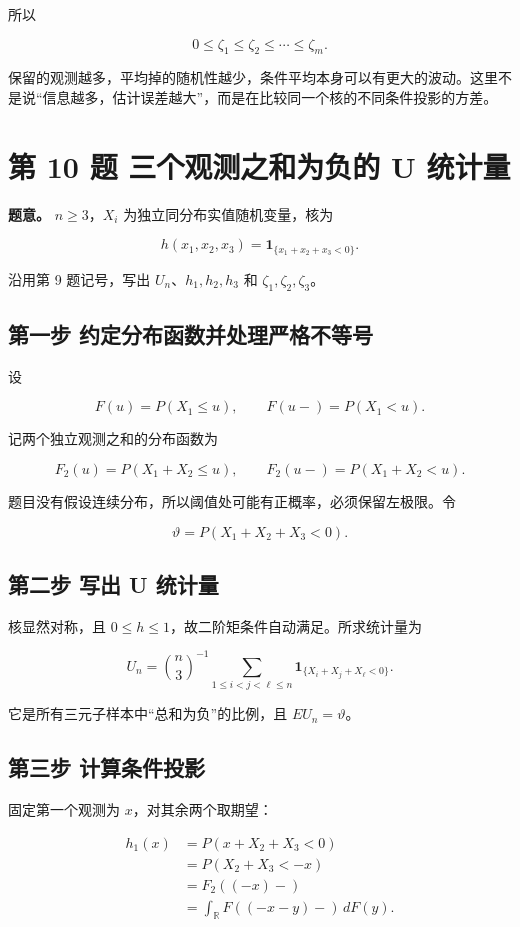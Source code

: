 所以

\[
\boxed{0\le\zeta_1\le\zeta_2\le\cdots\le\zeta_m.}
\]

 保留的观测越多，平均掉的随机性越少，条件平均本身可以有更大的波动。这里不是说“信息越多，估计误差越大”，而是在比较同一个核的不同条件投影的方差。

\section{第 10 题 三个观测之和为负的 U 统计量}

\textbf{题意。} $n\ge3$，$X_i$ 为独立同分布实值随机变量，核为

\[
h(x_1,x_2,x_3)=\mathbf1_{\{x_1+x_2+x_3<0\}}.
\]

沿用第 9 题记号，写出 $U_n$、$h_1,h_2,h_3$ 和 $\zeta_1,\zeta_2,\zeta_3$。

\subsection{第一步 约定分布函数并处理严格不等号}

设

\[
F(u)=P(X_1\le u),\qquad
F(u-)=P(X_1<u).
\]

记两个独立观测之和的分布函数为

\[
F_2(u)=P(X_1+X_2\le u),
\qquad F_2(u-)=P(X_1+X_2<u).
\]

题目没有假设连续分布，所以阈值处可能有正概率，必须保留左极限。令

\[
\vartheta=P(X_1+X_2+X_3<0).
\]

\subsection{第二步 写出 U 统计量}

核显然对称，且 $0\le h\le1$，故二阶矩条件自动满足。所求统计量为

\[
\boxed{
U_n=\binom n3^{-1}
\sum_{1\le i<j<\ell\le n}
\mathbf1_{\{X_i+X_j+X_\ell<0\}}.}
\]

它是所有三元子样本中“总和为负”的比例，且 $EU_n=\vartheta$。

\subsection{第三步 计算条件投影}

固定第一个观测为 $x$，对其余两个取期望：

\[
\begin{aligned}
h_1(x)
&=P(x+X_2+X_3<0)\\
&=P(X_2+X_3<-x)\\
&=\boxed{F_2((-x)-)}\\
&=\int_{\mathbb R}F((-x-y)-)\,dF(y).
\end{aligned}
\]

